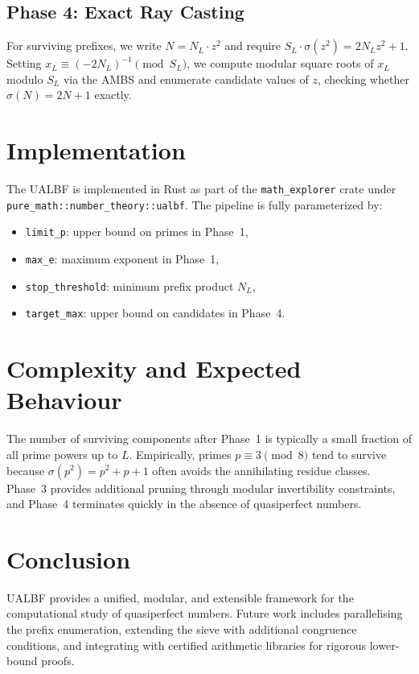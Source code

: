 \documentclass[12pt]{article}
\begin{document}
\subsection{Phase 4: Exact Ray Casting}

For surviving prefixes, we write $N = N_L \cdot z^2$ and require
$S_L \cdot \sigma(z^2) = 2 N_L z^2 + 1$. Setting $x_L \equiv (-2N_L)^{-1} \pmod{S_L}$,
we compute modular square roots of $x_L$ modulo $S_L$ via the AMBS and enumerate
candidate values of $z$, checking whether $\sigma(N) = 2N+1$ exactly.

\section{Implementation}

The UALBF is implemented in Rust as part of the \texttt{math\_explorer} crate
under \texttt{pure\_math::number\_theory::ualbf}. The pipeline is fully
parameterized by:
\begin{itemize}
    \item \texttt{limit\_p}: upper bound on primes in Phase~1,
    \item \texttt{max\_e}: maximum exponent in Phase~1,
    \item \texttt{stop\_threshold}: minimum prefix product $N_L$,
    \item \texttt{target\_max}: upper bound on candidates in Phase~4.
\end{itemize}

\section{Complexity and Expected Behaviour}

The number of surviving components after Phase~1 is typically a small fraction
of all prime powers up to $L$. Empirically, primes $p \equiv 3 \pmod{8}$ tend
to survive because $\sigma(p^2) = p^2 + p + 1$ often avoids the annihilating
residue classes. Phase~3 provides additional pruning through modular
invertibility constraints, and Phase~4 terminates quickly in the absence of
quasiperfect numbers.

\section{Conclusion}

UALBF provides a unified, modular, and extensible framework for the
computational study of quasiperfect numbers. Future work includes
parallelising the prefix enumeration, extending the sieve with additional
congruence conditions, and integrating with certified arithmetic libraries
for rigorous lower-bound proofs.



\end{document}
